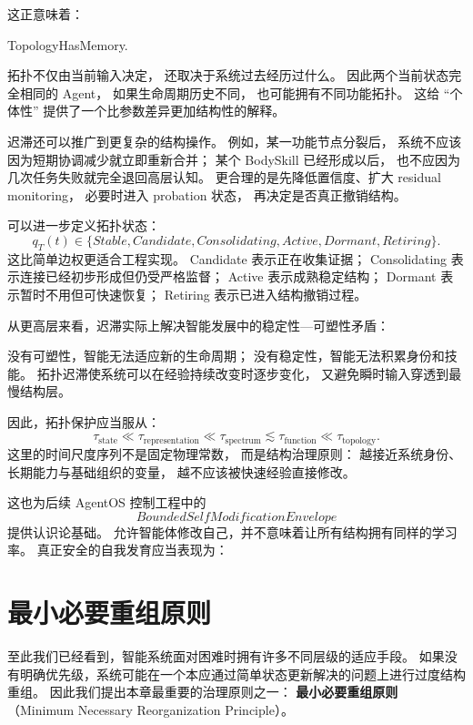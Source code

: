 这正意味着：
\begin{statementbox}
TopologyHasMemory.
\end{statementbox}
拓扑不仅由当前输入决定，
还取决于系统过去经历过什么。
因此两个当前状态完全相同的 Agent，
如果生命周期历史不同，
也可能拥有不同功能拓扑。
这给 ``个体性'' 提供了一个比参数差异更加结构性的解释。

迟滞还可以推广到更复杂的结构操作。
例如，某一功能节点分裂后，
系统不应该因为短期协调减少就立即重新合并；
某个 BodySkill 已经形成以后，
也不应因为几次任务失败就完全退回高层认知。
更合理的是先降低置信度、扩大 residual monitoring，
必要时进入 probation 状态，
再决定是否真正撤销结构。

可以进一步定义拓扑状态：
\[
q_T(t)
\in
\{
Stable,
Candidate,
Consolidating,
Active,
Dormant,
Retiring
\}.
\]
这比简单边权更适合工程实现。
Candidate 表示正在收集证据；
Consolidating 表示连接已经初步形成但仍受严格监督；
Active 表示成熟稳定结构；
Dormant 表示暂时不用但可快速恢复；
Retiring 表示已进入结构撤销过程。

从更高层来看，迟滞实际上解决智能发展中的稳定性—可塑性矛盾：
\begin{statementbox}
\centering
{}
\end{statementbox}
没有可塑性，智能无法适应新的生命周期；
没有稳定性，智能无法积累身份和技能。
拓扑迟滞使系统可以在经验持续改变时逐步变化，
又避免瞬时输入穿透到最慢结构层。

因此，拓扑保护应当服从：
\[
\tau_{\mathrm{state}}
\ll
\tau_{\mathrm{representation}}
\ll
\tau_{\mathrm{spectrum}}
\lesssim
\tau_{\mathrm{function}}
\ll
\tau_{\mathrm{topology}}.
\]
这里的时间尺度序列不是固定物理常数，
而是结构治理原则：
越接近系统身份、长期能力与基础组织的变量，
越不应该被快速经验直接修改。

这也为后续 AgentOS 控制工程中的
\[
BoundedSelfModificationEnvelope
\]
提供认识论基础。
允许智能体修改自己，并不意味着让所有结构拥有同样的学习率。
真正安全的自我发育应当表现为：
\begin{statementbox}
\centering
{}
\end{statementbox}

\section{最小必要重组原则}

至此我们已经看到，智能系统面对困难时拥有许多不同层级的适应手段。
如果没有明确优先级，系统可能在一个本应通过简单状态更新解决的问题上进行过度结构重组。
因此我们提出本章最重要的治理原则之一：
\textbf{最小必要重组原则}
（Minimum Necessary Reorganization Principle）。

